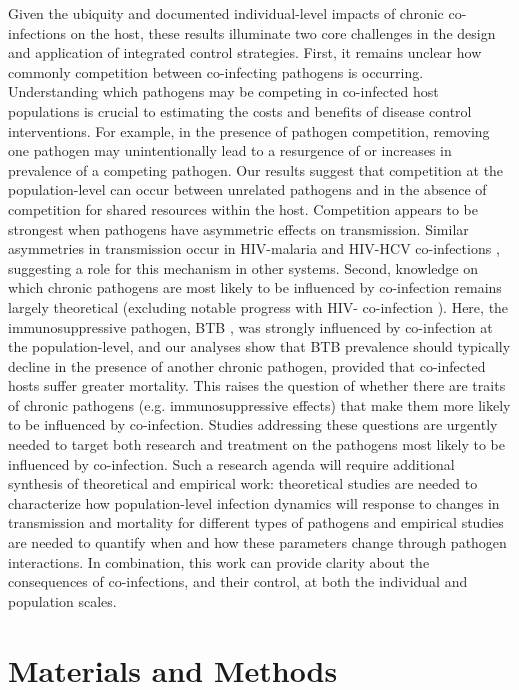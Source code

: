 \documentclass[10pt,letterpaper]{article}
\begin{document}
Given the ubiquity and documented individual-level impacts of chronic co-infections on the host, these results illuminate two core challenges in the design and application of integrated control strategies. First, it remains unclear how commonly competition between co-infecting pathogens is occurring. Understanding which pathogens may be competing in co-infected host populations is crucial to estimating the costs and benefits of disease control interventions. For example, in the presence of pathogen competition, removing one pathogen may unintentionally lead to a resurgence of or increases in prevalence of a competing pathogen. Our results suggest that competition at the population-level can occur between unrelated pathogens and in the absence of competition for shared resources within the host. Competition appears to be strongest when pathogens have asymmetric effects on transmission. Similar asymmetries in transmission occur in HIV-malaria \cite{abu-raddad_dual_2006} and HIV-HCV co-infections \cite{urbanus_hepatitis_2009}, suggesting a role for this mechanism in other systems. Second, knowledge on which chronic pathogens are most likely to be influenced by co-infection remains largely theoretical (excluding notable progress with HIV- co-infection \cite{abu-raddad_dual_2006, lloyd-smith_hiv-1/parasite_2008}). Here, the immunosuppressive pathogen, BTB \cite{beechler_innate_2012, beechler_enemies_2015}, was strongly influenced by co-infection at the population-level, and our analyses show that BTB prevalence should typically decline in the presence of another chronic pathogen, provided that co-infected hosts suffer greater mortality. This raises the question of whether there are traits of chronic pathogens (e.g. immunosuppressive effects) that make them more likely to be influenced by co-infection. Studies addressing these questions are urgently needed to target both research and treatment on the pathogens most likely to be influenced by co-infection. Such a research agenda will require additional synthesis of theoretical and empirical work: theoretical studies are needed to characterize how population-level infection dynamics will response to changes in transmission and mortality for different types of pathogens and empirical studies are needed to quantify when and how these parameters change through pathogen interactions. In combination, this work can provide clarity about the consequences of co-infections, and their control, at both the individual and population scales.


\section*{Materials and Methods}
\end{document}
